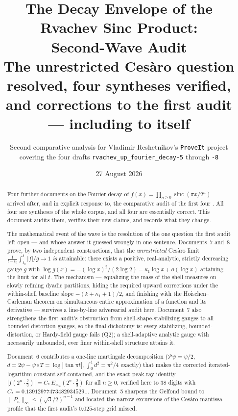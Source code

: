 \documentclass[11pt,oneside]{article}
\title{\bfseries The Decay Envelope of the Rvachev Sinc Product:\\
Second-Wave Audit\\[0.35em]
\large The unrestricted Ces\`aro question resolved, four syntheses verified,\\
and corrections to the first audit --- including to itself}
\author{Second comparative analysis for Vladimir Reshetnikov's \texttt{ProveIt} project\\
\small covering the four drafts \nolinkurl{rvachev_up_fourier_decay-5} through \nolinkurl{-8}}
\date{27 August 2026}
\theoremstyle{definition}
\theoremstyle{remark}
\newcommand{\sinc}{\operatorname{sinc}}
\begin{document}
\maketitle

\begin{abstract}
Four further documents on the Fourier decay of
$f(x)=\prod_{n\ge0}\sinc(\pi x/2^n)$ arrived after, and in explicit
response to, the comparative audit of the first four
\cite{audit}.  All four are syntheses of the whole corpus, and all four
are essentially correct.  This document audits them, verifies their new
claims, and records what they change.

The mathematical event of the wave is the resolution of the one question
the first audit left open --- and whose answer it guessed wrongly in one
sentence.  Documents~7 and~8 prove, by two independent constructions,
that the \emph{unrestricted} Ces\`aro limit
$\frac1{t-t_0}\int_{t_0}^t|f|/g\to1$ \emph{is} attainable: there exists a
positive, real-analytic, strictly decreasing gauge $g$ with
$\log g(x)=-(\log x)^2/(2\log2)-\kappa_1\log x+o(\log x)$ attaining the
limit for all $t$.  The mechanism --- equalizing the mass of the shell
measures on slowly refining dyadic partitions, hiding the required
upward corrections under the within-shell baseline slope
$-(k+\kappa_1+1)/2$, and finishing with the Hoischen--Carleman theorem
on simultaneous entire approximation of a function and its derivative
--- survives a line-by-line adversarial audit here.  Document~7 also
strengthens the first audit's obstruction from shell-shape-stabilizing
gauges to all bounded-distortion gauges, so the final dichotomy is:
every stabilizing, bounded-distortion, or Hardy-field gauge fails
(Q2); a shell-adaptive analytic gauge with necessarily unbounded,
ever finer within-shell structure attains it.

Document~6 contributes a one-line martingale decomposition
($\mathcal P\psi=\psi/2$, $d=2\psi-\psi\circ T=\log|\tan\pi t|$,
$\int_0^1d^2=\pi^2/4$ exactly) that makes the corrected iterated-logarithm
constant self-contained, and the exact peak-ray identity
$|f(2^n\cdot\tfrac23)|=C_*\,E_{\kappa_\infty}(2^n\cdot\tfrac23)$ for all
$n\ge0$, verified here to $38$ digits with
$C_*=0.13912977473482934529\ldots$  Document~5 sharpens the Gelfond
bound to $\|P_n\|_\infty\le(\sqrt3/2)^{n-1}$ and located the narrow
excursions of the Ces\`aro mantissa profile that the first audit's
$0.025$-step grid missed.


\end{abstract}
\end{document}
